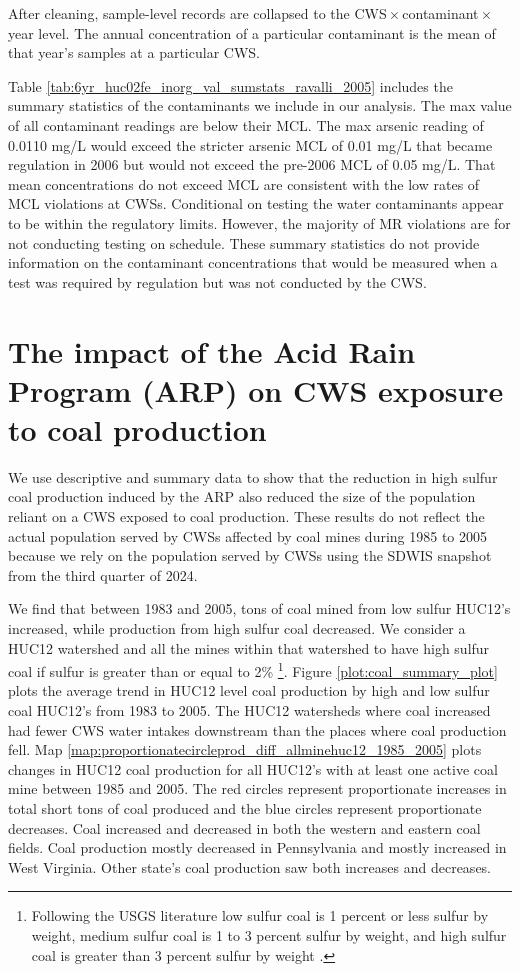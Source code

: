\documentclass{article}
\begin{document}
After cleaning, sample-level records are collapsed to the CWS\,$\times$\,contaminant\,$\times$\,year level. The annual concentration of a particular contaminant is the mean of that year's samples at a particular CWS.

Table \ref{tab:6yr_huc02fe_inorg_val_sumstats_ravalli_2005} includes the summary statistics of the contaminants we include in our analysis. The max value of all contaminant readings are below their MCL. The max arsenic reading of 0.0110 mg/L would exceed the stricter arsenic MCL of 0.01 mg/L that became regulation in 2006 but would not exceed the pre-2006 MCL of 0.05 mg/L. That mean concentrations do not exceed MCL are consistent with the low rates of MCL violations at CWSs. Conditional on testing the water contaminants appear to be within the regulatory limits. However, the majority of MR violations are for not conducting testing on schedule. These summary statistics do not provide information on the contaminant concentrations that would be measured when a test was required by regulation but was not conducted by the CWS.



\section{The impact of the Acid Rain Program (ARP) on CWS exposure to coal production}

We use descriptive and summary data to show that the reduction in high sulfur coal production induced by the ARP also reduced the size of the population reliant on a CWS exposed to coal production. These results do not reflect the actual population served by CWSs affected by coal mines during 1985 to 2005 because we rely on the population served by CWSs using the SDWIS snapshot from the third quarter of 2024.

We find that between 1983 and 2005, tons of coal mined from low sulfur HUC12's increased, while production from high sulfur coal decreased. We consider a HUC12 watershed and all the mines within that watershed to have high sulfur coal if sulfur is greater than or equal to 2\% \footnote{Following the USGS literature low sulfur coal is 1 percent or less sulfur by weight, medium sulfur coal is 1 to 3 percent sulfur by weight, and high sulfur coal is greater than 3 percent sulfur by weight \cite{schweinfurth2009introduction}.}. Figure \ref{plot:coal_summary_plot} plots the average trend in HUC12 level coal production by high and low sulfur coal HUC12's from 1983 to 2005. The HUC12 watersheds where coal increased had fewer CWS water intakes downstream than the places where coal production fell. Map \ref{map:proportionatecircleprod_diff_allminehuc12_1985_2005} plots changes in HUC12 coal production for all HUC12's with at least one active coal mine between 1985 and 2005. The red circles represent proportionate increases in total short tons of coal produced and the blue circles represent proportionate decreases. Coal increased and decreased in both the western and eastern coal fields. Coal production mostly decreased in Pennsylvania and mostly increased in West Virginia. Other state's coal production saw both increases and decreases.
\end{document}
